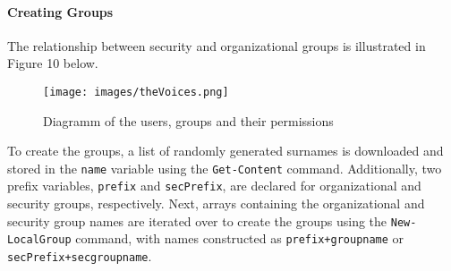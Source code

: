 \documentclass[a4paper]{article}
\newcommand{\abc}{\hfill \break}
\begin{document}
\paragraph{Creating Groups}\abc
The relationship between security and organizational groups is illustrated in Figure 10 below.
\begin{figure}[h]
	\texttt{[image: images/theVoices.png]}
	\centering
	\caption{Diagramm of the users, groups and their permissions}
\end{figure}

To create the groups, a list of randomly generated surnames is downloaded and stored in the \texttt{name} variable using the \texttt{Get-Content} command. Additionally, two prefix variables, \texttt{prefix} and \texttt{secPrefix}, are declared for organizational and security groups, respectively.\abc
Next, arrays containing the organizational and security group names are iterated over to create the groups using the \texttt{New-LocalGroup} command, with names constructed as \texttt{prefix+groupname} or \texttt{secPrefix+secgroupname}.
\newpage
\end{document}
